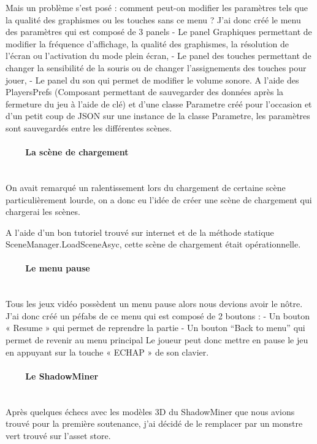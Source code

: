 \documentclass[titlepage, 13px, a4paper]{report}
\begin{document}
Mais un problème s’est posé : comment peut-on modifier les paramètres tels que la qualité des graphismes ou les touches sans ce menu ?
J’ai donc créé le menu des paramètres qui est composé de 3 panels 
-	Le panel Graphiques permettant de modifier la fréquence d’affichage, la qualité des graphismes, la résolution 
	de l’écran ou l’activation du mode plein écran,
-	Le panel des touches permettant de changer la sensibilité de la souris ou de changer l’assignements des touches pour jouer,
-	Le panel du son qui permet de modifier le volume sonore.
A l’aide des PlayersPrefs (Composant permettant de sauvegarder des données après la fermeture du jeu à l’aide de clé) 
et d’une classe Parametre créé pour l’occasion et d’un petit coup de JSON sur une instance de la classe Parametre, 
les paramètres sont sauvegardés entre les différentes scènes. \\


\paragraph{~~~~La scène de chargement} \hspace{0pt} \\
On avait remarqué un ralentissement lors du chargement de certaine scène particulièrement lourde, on a donc eu 
l’idée de créer une scène de chargement qui chargerai les scènes.

A l’aide d’un bon tutoriel trouvé sur internet et de la méthode statique SceneManager.LoadSceneAsyc, cette scène 
de chargement était opérationnelle. \\


\paragraph{~~~~Le menu pause} \hspace{0pt} \\
Tous les jeux vidéo possèdent un menu pause alors nous devions avoir le nôtre.
J’ai donc créé un péfabs de ce menu qui est composé de 2 boutons : 
-	Un bouton « Resume » qui permet de reprendre la partie
-	Un bouton “Back to menu” qui permet de revenir au menu principal
Le joueur peut donc mettre en pause le jeu en appuyant sur la touche « ECHAP » de son clavier. \\


\paragraph{~~~~Le ShadowMiner} \hspace{0pt} \\
Après quelques échecs avec les modèles 3D du ShadowMiner que nous avions trouvé pour la première soutenance, 
j’ai décidé de le remplacer par un monstre vert trouvé sur l’asset store.
\end{document}
